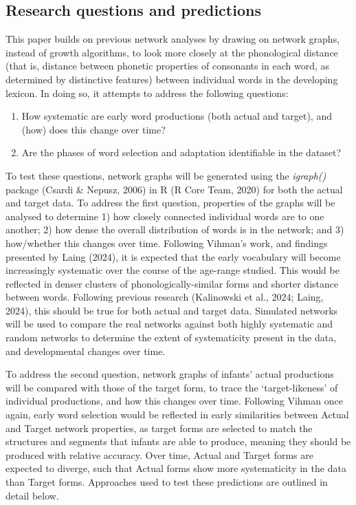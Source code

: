 \documentclass[
  man]{apa6}
\providecommand{\tightlist}{%
  \setlength{\itemsep}{0pt}\setlength{\parskip}{0pt}}
\begin{document}
\subsection{Research questions and predictions}\label{research-questions-and-predictions}

This paper builds on previous network analyses by drawing on network graphs, instead of growth algorithms, to look more closely at the phonological distance (that is, distance between phonetic properties of consonants in each word, as determined by distinctive features) between individual words in the developing lexicon. In doing so, it attempts to address the following questions:

\begin{enumerate}
\def\labelenumi{\arabic{enumi}.}
\tightlist
\item
  How systematic are early word productions (both actual and target), and (how) does this change over time?
\item
  Are the phases of word selection and adaptation identifiable in the dataset?
\end{enumerate}

To test these questions, network graphs will be generated using the \emph{igraph()} package (Csardi \& Nepusz, 2006) in R (R Core Team, 2020) for both the actual and target data. To address the first question, properties of the graphs will be analysed to determine 1) how closely connected individual words are to one another; 2) how dense the overall distribution of words is in the network; and 3) how/whether this changes over time. Following Vihman's work, and findings presented by Laing (2024), it is expected that the early vocabulary will become increasingly systematic over the course of the age-range studied. This would be reflected in denser clusters of phonologically-similar forms and shorter distance between words. Following previous research (Kalinowski et al., 2024; Laing, 2024), this should be true for both actual and target data. Simulated networks will be used to compare the real networks against both highly systematic and random networks to determine the extent of systematicity present in the data, and developmental changes over time.

To address the second question, network graphs of infants' actual productions will be compared with those of the target form, to trace the `target-likeness' of individual productions, and how this changes over time. Following Vihman once again, early word selection would be reflected in early similarities between Actual and Target network properties, as target forms are selected to match the structures and segments that infants are able to produce, meaning they should be produced with relative accuracy. Over time, Actual and Target forms are expected to diverge, such that Actual forms show more systematicity in the data than Target forms. Approaches used to test these predictions are outlined in detail below.
\end{document}
